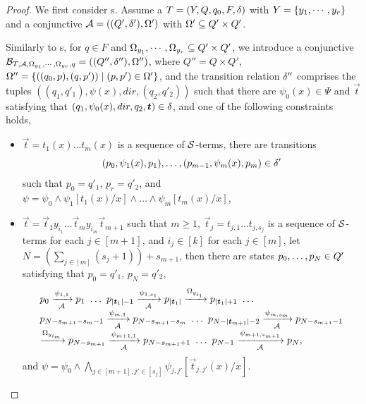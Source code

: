 \begin{proof}

We first consider \SSPT{}s. Assume a \SSPT{} $T=(Y, Q, q_0, F, \delta)$ with $Y = \{y_1,\cdots, y_r\}$ and a conjunctive \SA{} $\mathcal{A} = ((Q', \delta'), \Omega')$ with $\Omega' \subseteq Q' \times Q'$. 

Similarly to \FFA{}s, for $q \in F$ and  $\Omega_{y_1}, \cdots, \Omega_{y_r} \subseteq Q' \times Q'$, we  introduce a conjunctive \SSA{} $\mathcal{B}_{T, \mathcal{A}, \Omega_{y_1}, \cdots, \Omega_{y_r}, q} = ((Q'', \delta''), \Omega'')$, where $Q'' = Q \times Q'$, $\Omega'' = \{((q_0, p), (q, p')) \mid (p, p') \in \Omega'\}$, and the transition relation $\delta''$ comprises the tuples 
$((q_1, q'_1), \psi(x), dir, (q_2, q'_2))$ such that there are $\psi_0(x) \in \Psi$ and $\vec{t}$ satisfying that $(q_1, \psi_0(x), dir, q_2, \vec{t}) \in \transrel$, and one of the following constraints holds, 
\begin{itemize}
\item $\vec{t} = t_1(x) \ldots t_m(x)$ is a sequence of $\mathcal{S}$-terms, there are transitions 
$$(p_{0}, \psi_1(x), p_{1}), \ldots, (p_{m-1}, \psi_m(x), p_m) \in \delta'$$ 
such that $p_0 = q'_1$, $p_r = q'_2$, and $\psi = \psi_0 \wedge \psi_1[t_1(x)/x] \wedge \ldots \wedge \psi_m[t_m(x)/x]$,
%
\item $\vec{t} = \vec{t}_1 y_{i_1} \ldots \vec{t}_{m} y_{i_{m}} \vec{t}_{m+1}$ such that $m \ge 1$, $\vec{t}_j = t_{j, 1} \ldots t_{j, s_j}$ is a sequence of $\mathcal{S}$-terms for each $j \in [m+1]$,  and $i_j \in [k]$ for each $j \in [m]$, let $N = (\sum \limits_{j \in [m]} (s_j+ 1)) +s_{m+1}$, then there are states $p_0, \ldots, p_{N} \in Q'$ satisfying that $p_0 = q'_1$, $p_{N} = q'_2$,  
%
$$
\begin{array}{l}
p_0 \xrightarrow[\Aut]{\psi_{1,1}} p_1\ \ldots\ p_{|\vec{t}_1|-1} \xrightarrow[\Aut]{\psi_{1, s_1}} p_{|\vec{t}_1|} \xrightarrow{\conacc_{y_{i_1}}} p_{|\vec{t}_1|+1}\ \ldots\\
p_{N - s_{m+1} - s_m -1} \xrightarrow[\Aut]{\psi_{m, 1}} p_{N - s_{m+1} - s_m } \ \ldots\ p_{N - |\vec{t}_{m+1}| - 2} \xrightarrow[\Aut]{\psi_{m, s_m}} p_{N-s_{m+1}-1}\\
 \xrightarrow{\conacc_{y_{i_m}}} p_{N- s_{m+1}} \xrightarrow[\Aut]{\psi_{m+1, 1}} p_{N -s_{m+1}+1}\ \ldots\ p_{N - 1} \xrightarrow[\Aut]{\psi_{m+1,  s_{m+1}} } p_{N},
\end{array}
 $$ 
 and $\psi = \psi_0 \wedge \bigwedge \limits_{j \in [m+1], j' \in [s_j]} \psi_{j, j'} [\vec{t}_{j, j'}(x)/x].$

\end{itemize}
\end{proof}
